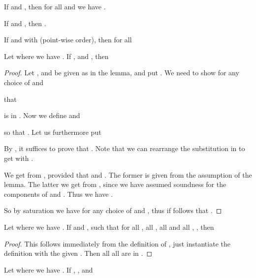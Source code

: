 \documentclass[preprint]{sigplanconf}
\begin{document}
\begin{definition}
\begin{figure*}
\begin{lemma}
  \label{lem:interpret-move-subst}
  If  and
  , then
  for all  and  we have
  .
\end{lemma}

\begin{lemma}
  \label{lem:interpret-move-ty-subst}
  If 
  and , then
  .
\end{lemma}


\begin{lemma}
  \label{lem:monotonicity-interpretation}
  If  and
   with 
  (point-wise order), then for all 
  
\end{lemma}

\begin{lemma}
  \label{lem:constructor-closure}
  Let  where we have
  .
  If ,  and
  , then
  
\end{lemma}
\begin{proof}
  Let ,  and  be given as in the lemma, and
  put .
  We need to show for any choice of  and
  
  that
  
  is in .
  Now we define  and
  
  so that .
  Let us furthermore put
  
  By , it suffices to prove
  that .
  Note that we can rearrange the substitution in  to get
   with
  .

  We get  from
  ,
  provided that  and
  .
  The former is given from the assumption of the lemma.
  The latter we get from ,
  since we have assumed soundness for the components of  and
  .
  Thus we have .

  So by saturation we have  for any choice
  of  and , thus if follows that
  .
\end{proof}

\begin{lemma}
  \label{lem:coind-is-largest-fp}
  Let  where we have
  .
  If  and , such that for all
  , all ,
  all  and all
  ,
  ,
  then
  
\end{lemma}
\begin{proof}
  This follows immediately from the definition of , just instantiate
  the definition with the given .
  Then all all  are in .
\end{proof}

\begin{lemma}
  \label{lem:corec-closure}
  Let  where we have
  .
  If , ,
   and
  

\end{lemma}
\end{figure*}
\end{definition}
\end{document}

